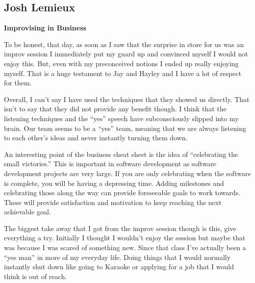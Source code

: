 \documentclass[12pt,letterpaper]{article}
\begin{document}
\clearpage
\subsection{Josh Lemieux}
\textbf{Improvising in Business}\par
To be honest, that day, as soon as I saw that the surprise in store for us was an improv session I immediately put my guard up and convinced myself I would not enjoy this. But, even with my preconceived notions I ended up really enjoying myself. That is a huge testament to Jay and Hayley and I have a lot of respect for them.\par
      	Overall, I can’t say I have used the techniques that they showed us directly. That isn’t to say that they did not provide any benefit though. I think that the listening techniques and the “yes” speech have subconsciously slipped into my brain. Our team seems to be a “yes” team, meaning that we are always listening to each other’s ideas and never instantly turning them down.\par
      	An interesting point of the business cheat sheet is the idea of “celebrating the small victories.” This is important in software development as software development projects are very large. If you are only celebrating when the software is complete, you will be having a depressing time. Adding milestones and celebrating those along the way can provide foreseeable goals to work towards. These will provide satisfaction and motivation to keep reaching the next achievable goal.\par
      	The biggest take away that I got from the improv session though is this, give everything a try. Initially I thought I wouldn’t enjoy the session but maybe that was because I was scared of something new. Since that class I’ve actually been a “yes man” in more of my everyday life. Doing things that I would normally instantly shut down like going to Karaoke or applying for a job that I would think is out of reach.

\clearpage
\end{document}
